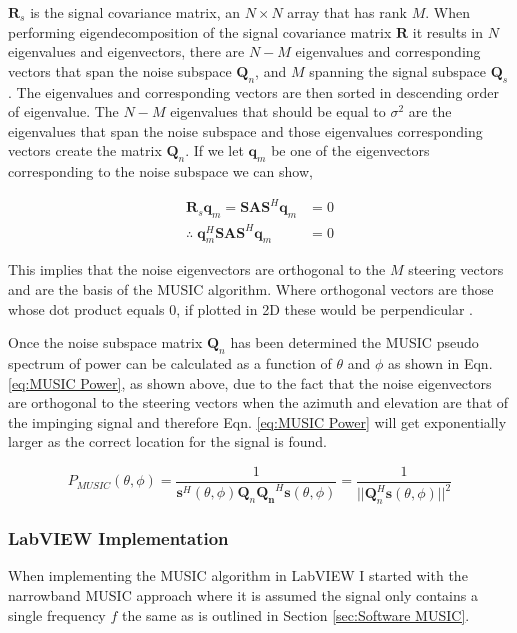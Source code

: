 \documentclass{UoNMCHA}
\numberwithin{equation}{section}
\begin{document}
    $\mathbf{R}_s$ is the signal covariance matrix, an $N \times N$ array that has rank $M$. When performing eigendecomposition of the signal covariance matrix $\mathbf{R}$ it results in $N$ eigenvalues and eigenvectors, there are $N - M$ eigenvalues and corresponding vectors that span the noise subspace $\mathbf{Q}_n$, and $M$ spanning the signal subspace $\mathbf{Q}_s$.
    The eigenvalues and corresponding vectors are then sorted in descending order of eigenvalue. The $N-M$ eigenvalues that should be equal to $\sigma^2$ are the eigenvalues that span the noise subspace and those eigenvalues corresponding vectors create the matrix $\mathbf{Q}_n$. If we let $\mathbf{q}_m$ be one of the eigenvectors corresponding to the noise subspace we can show,
    
    \begin{equation}
    \begin{split}
        \mathbf{R}_s\mathbf{q}_m = \mathbf{SAS}^H\mathbf{q}_m & = 0\\
        \therefore \; \mathbf{q}_m^H\mathbf{SAS}^H\mathbf{q}_m & = 0
    \end{split}
    \end{equation}

    This implies that the noise eigenvectors are orthogonal to the $M$ steering vectors and are the basis of the MUSIC algorithm. Where orthogonal vectors are those whose dot product equals $0$, if plotted in 2D these would be perpendicular \citep{Wei}.
    
    Once the noise subspace matrix $\mathbf{Q}_n$ has been determined the MUSIC pseudo spectrum of power can be calculated as a function of $\theta$ and $\phi$ as shown in Eqn. \ref{eq:MUSIC Power}, as shown above, due to the fact that the noise eigenvectors are orthogonal to the steering vectors when the azimuth and elevation are that of the impinging signal and therefore Eqn. \ref{eq:MUSIC Power} will get exponentially larger as the correct location for the signal is found.
    
    \begin{equation}
        P_{MUSIC}(\theta,\phi) = \frac{1}{\mathbf{s}^H(\theta,\phi)\mathbf{Q}_n\mathbf{Q_n}^H\mathbf{s}(\theta,\phi)} = \frac{1}{||\mathbf{Q}_n^H\mathbf{s}(\theta,\phi)||^2}
        \label{eq:MUSIC Power}
    \end{equation}

\subsubsection{LabVIEW Implementation} \label{sec:MUSIC LabVIEW}
    When implementing the MUSIC algorithm in LabVIEW I started with the narrowband MUSIC approach where it is assumed the signal only contains a single frequency $f$ the same as is outlined in Section \ref{sec:Software MUSIC}.
    
\end{document}
